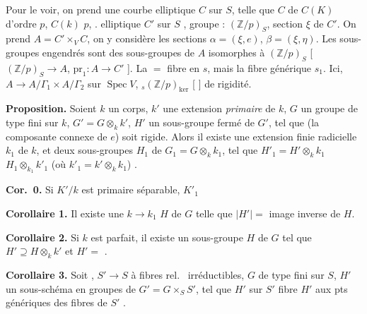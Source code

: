 \documentclass[11pt,a4paper]{article}
\begin{document}
Pour le voir, on prend une courbe elliptique  $C$ sur $S$, telle
que \ill{} \ill{} $C$ \ill{} \ill{} \ill{} \ill{} de \ill{} \ill{} \ill{}
$C(K)$ \ill{} d'ordre $p$, \ill{} $C(k)$ \ill{} \ill{} $p$, \ill{} \ill{}. \ill{}
\ill{} \ill{} \ill{} elliptique $C'$ sur $S$ \ill{}, \ill{} groupe \ill{} :
$(\mathbb{Z}/p)_S$, \ill{} \ill{} section $\xi$ de $C'$. On prend
$A = C' \times_V C$, on y considère les sections $\alpha = (\xi, e)$,
$\beta = (\xi, \eta)$. Les sous-groupes 
engendrés sont des sous-groupes de $A$ isomorphes à $(\mathbb{Z}/p)_S$
[\ill{} \ill{} \ill{} \ill{} \ill{} $(\mathbb{Z}/p)_S \to A$, \ill{} \ill{}
\ill{} \ill{} \ill{} \ill{} \ill{} $\mathrm{pr}_1 \colon A \to C'$ \ill{}]. La
\ill{} \ill{} $=$ \struck{\ill{}} fibre en $s$, mais \ill{} \ill{} la fibre
générique $s_1$. Ici, \ill{} \ill{} \ill{}
$A \to A/\Gamma_1 \times A/\Gamma_2$ \struck{\ill{}} \ill{} \ill{} \ill{}
\ill{} sur $\operatorname{Spec} V$, \ill{} \ill{}
\ill{} ${}_s(\mathbb{Z}/p)_{\ker}$ [\ill{} \ill{} \ill{} \ill{} \ill{} \ill{}]
\ill{} \ill{} \ill{} \ill{} \ill{} \ill{} \ill{} \ill{} \ill{} \ill{} de
rigidité.

\textbf{Proposition.} Soient $k$ un corps, $k'$ une extension
\emph{primaire} de $k$, $G$ un \add{\ill{}} groupe de type fini sur $k$,
$G' = G \otimes_k k'$, $H'$ un sous-groupe fermé de $G'$, tel que
  (la composante connexe \ill{} de $e$)
\struck{\ill{}} soit rigide. Alors il existe une 
extension finie radicielle $k_1$ de $k$,  et deux
sous-groupes  \struck{\ill{}} $H_1$ de
$G_1 = G \otimes_k k_1$, tel que $H'_1 = H' \otimes_k k_1$
\struck{\ill{}} \add{\ill{}} $H_1 \otimes_{k_1} k'_1$ (où
$k'_1 = k' \otimes_k k_1$) \ill{} \ill{} \ill{} \ill{}.

\textbf{Cor.~0.} Si $K'/k$ est \struck{\ill{}} primaire séparable, \ill{}
$K'_1$ \ill{}

\textbf{Corollaire 1.} Il existe une \struck{\ill{}} \struck{\ill{}}
$k \to k_1$ \ill{} \ill{} \ill{} $H$ de $G$ telle que $|H'| =$ image inverse
de $H$.

\textbf{Corollaire 2.} Si $k$ est parfait, il existe un sous-groupe $H$ de
$G$ tel que $H' \supseteq H \otimes_k k'$ et $H' =$ \ill{} \ill{} \ill{}.

\textbf{Corollaire 3.} Soit  , \add{\ill{}} $S' \to S$ à fibres rel.\ \ill{}
\ill{} \ill{} irréductibles, \struck{\ill{}}  $G$ \struck{\ill{}} 
de type fini sur $S$, $H'$ un sous-schéma en groupes de
$G' = G \times_S S'$,  tel que $H'$ \ill{} \ill{} sur $S'$
\ill{} \ill{} \ill{} \ill{} fibre \ill{} \ill{} $H'$ aux pts génériques des
fibres de $S'$ \ill{} .
\end{document}
